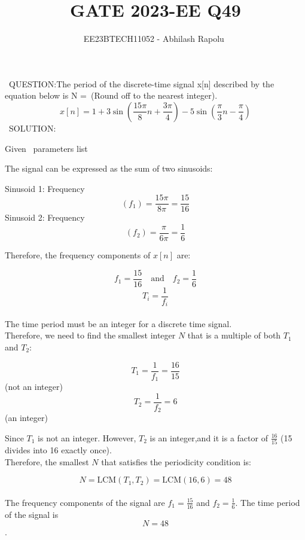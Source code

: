 \documentclass[journal,12pt,twocolumn]{IEEEtran}
\title{GATE 2023-EE Q49}
\author{EE23BTECH11052 - Abhilash Rapolu $^{}$%
}
\begin{document}
\maketitle
\newpage
\bigskip
\ QUESTION:The period of the discrete-time signal x[n] described by the equation below is N =\ (Round off to the nearest integer).
$$x[n] = 1 + 3\sin\left(\frac{15\pi}{8}n + \frac{3\pi}{4}\right) - 5\sin\left(\frac{\pi}{3}n - \frac{\pi}{4}\right)$$
\ SOLUTION:  
\begin{table}[htbp] \small
\centering

\caption{Given \, parameters list}
\end{table}
The signal can be expressed as the sum of two sinusoids:

 Sinusoid 1: Frequency $$(f_1) = \frac{15\pi}{8\pi} = \frac{15}{16}$$
 Sinusoid 2: Frequency $$(f_2) = \frac{\pi}{6\pi} = \frac{1}{6}$$

Therefore, the frequency components of $x[n]$ are:

$$f_1 = \frac{15}{16} \quad \text{and} \quad f_2 = \frac{1}{6}$$
 $$T_i = \frac{1}{f_i}$$ 
\\The time period must be an integer for a discrete time signal.
\\Therefore, we need to find the smallest integer $N$ that is a multiple of both $T_1$ and $T_2$:

 $$T_1 = \frac{1}{f_1} = \frac{16}{15}$$ (not an integer)
 $$T_2 = \frac{1}{f_2} = 6$$ (an integer)

Since $T_1$ is not an integer. However, $T_2$ is an integer,and it is a factor of $\frac{16}{15}$ (15 divides into 16 exactly once). 
\\Therefore, the smallest $N$ that satisfies the periodicity condition is:

$$N = \text{LCM}(T_1, T_2) = \text{LCM}(16, 6) = 48$$
\\The frequency components of the signal are $f_1 = \frac{15}{16}$ and $f_2 = \frac{1}{6}$. The time period of the signal is $$N =48$$.
\end{document}
